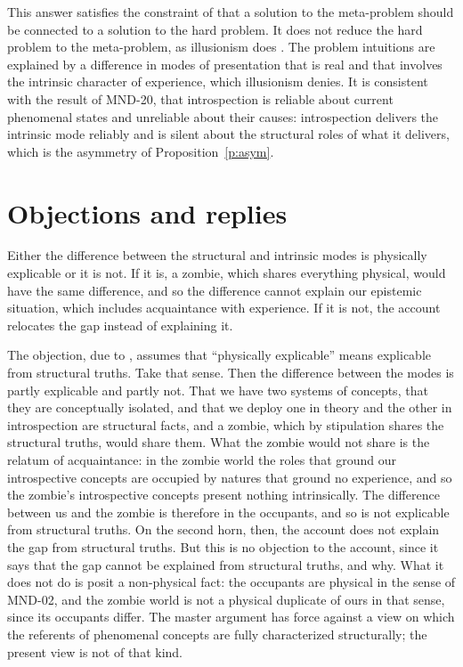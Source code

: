 \documentclass{situationist-preprint}
\begin{document}
This answer satisfies the constraint of \citet{Chalmers2018} that a solution to the meta-problem should be connected to a solution to the hard problem. It does not reduce the hard problem to the meta-problem, as illusionism does \citep{Frankish2016}. The problem intuitions are explained by a difference in modes of presentation that is real and that involves the intrinsic character of experience, which illusionism denies. It is consistent with the result of MND-20, that introspection is reliable about current phenomenal states and unreliable about their causes: introspection delivers the intrinsic mode reliably and is silent about the structural roles of what it delivers, which is the asymmetry of Proposition~\ref{p:asym}.

\section{Objections and replies}\label{s:obj}

\begin{objection}\label{o:master}
Either the difference between the structural and intrinsic modes is physically explicable or it is not. If it is, a zombie, which shares everything physical, would have the same difference, and so the difference cannot explain our epistemic situation, which includes acquaintance with experience. If it is not, the account relocates the gap instead of explaining it.
\end{objection}

\begin{reply}
The objection, due to \citet{Chalmers2007}, assumes that \enquote{physically explicable} means explicable from structural truths. Take that sense. Then the difference between the modes is partly explicable and partly not. That we have two systems of concepts, that they are conceptually isolated, and that we deploy one in theory and the other in introspection are structural facts, and a zombie, which by stipulation shares the structural truths, would share them. What the zombie would not share is the relatum of acquaintance: in the zombie world the roles that ground our introspective concepts are occupied by natures that ground no experience, and so the zombie's introspective concepts present nothing intrinsically. The difference between us and the zombie is therefore in the occupants, and so is not explicable from structural truths. On the second horn, then, the account does not explain the gap from structural truths. But this is no objection to the account, since it says that the gap cannot be explained from structural truths, and why. What it does not do is posit a non-physical fact: the occupants are physical in the sense of MND-02, and the zombie world is not a physical duplicate of ours in that sense, since its occupants differ. The master argument has force against a view on which the referents of phenomenal concepts are fully characterized structurally; the present view is not of that kind.
\end{reply}
\end{document}
